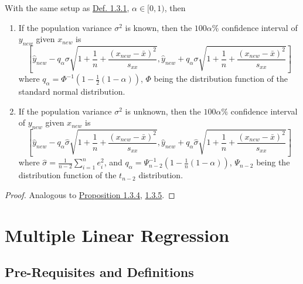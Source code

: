 \documentclass[11pt,fleqn]{book} %
\begin{document}
\begin{proposition} \label{prop:136}
With the same setup as \hyperref[def:131]{Def. 1.3.1}, \(\alpha \in [0, 1)\), then
\begin{enumerate}
\item If the population variance \(\sigma^2\) is known, then the \(100\alpha\%\) confidence interval of \(y_{new}\) given \(x_{new}\) is
\[
\left[\hat{y}_{new} - q_\alpha\sigma\sqrt{1 + \frac1n + \frac{(x_{new} - \bar{x})^2}{s_{xx}}}, \hat{y}_{new} + q_\alpha\sigma\sqrt{1 + \frac1n + \frac{(x_{new} - \bar{x})^2}{s_{xx}}}\right]
\]
where \(q_\alpha = \Phi^{-1}\left(1 - \frac12(1 - \alpha)\right)\), \(\Phi\) being the distribution function of the standard normal distribution.
\item If the population variance \(\sigma^2\) is unknown, then the \(100\alpha\%\) confidence interval of \(y_{new}\) given \(x_{new}\) is
\[
\left[\hat{y}_{new} - q_\alpha\hat{\sigma}\sqrt{1 + \frac1n + \frac{(x_{new} - \bar{x})^2}{s_{xx}}}, \hat{y}_{new} + q_\alpha\hat{\sigma}\sqrt{1 + \frac1n + \frac{(x_{new} - \bar{x})^2}{s_{xx}}}\right]
\]
where \(\hat{\sigma} = \frac{1}{n - 2}\sum_{i=1}^ne_i^2\), and \(q_\alpha = \Psi_{n - 2}^{-1}\left(1 - \frac1n(1 - \alpha)\right)\), \(\Psi_{n - 2}\) being the distribution function of the \(t_{n - 2}\) distribution. 
\end{enumerate}
\end{proposition}
\begin{proof} Analogous to \hyperref[prop:134]{Proposition 1.3.4}, \hyperref[prop:135]{1.3.5}.
\end{proof}


\chapter{Multiple Linear Regression}


\section{Pre-Requisites and Definitions}
\end{document}
